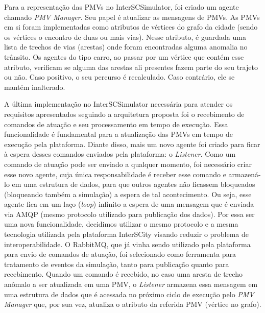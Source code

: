     

Para a representação das PMVs no InterSCSimulator, foi criado um agente chamado \textit{PMV Manager}.
Seu papel é atualizar as mensagens de PMVs.
As PMVs em si foram implementadas como atributos de vértices do grafo da cidade (sendo os vértices o encontro de duas ou mais vias).
Nesse atributo, é guardada uma lista de trechos de vias (arestas) onde foram encontradas alguma anomalia no trânsito.
Os agentes do tipo carro, ao passar por um vértice que contém esse atributo, verificam se alguma das arestas ali presentes fazem parte do seu trajeto ou não.
Caso positivo, o seu percurso é recalculado.
Caso contrário, ele se mantém inalterado.

A última implementação no InterSCSimulator necessária para atender os requisitos apresentados seguindo a arquitetura proposta foi o recebimento de comandos de atuação e
seu processamento em tempo de execução.
Essa funcionalidade é fundamental para a atualização das PMVs em tempo de execução pela plataforma.
Diante disso, mais um novo agente foi criado para ficar à espera desses comandos enviados pela plataforma: o \textit{Listener}.
Como um comando de atuação pode ser enviado a qualquer momento, foi necessário criar esse novo agente, cuja única responsabilidade é receber esse comando e armazená-lo em uma
estrutura de dados, para que outros agentes não ficassem bloqueados (bloqueando também a simulação) a espera de tal acontecimento.
Ou seja, esse agente fica em um laço (\textit{loop}) infinito a espera de uma mensagem que é enviada via AMQP (mesmo protocolo utilizado para publicação dos dados).
Por essa ser uma nova funcionalidade, decidimos utilizar o mesmo protocolo e a mesma tecnologia utilizada pela plataforma InterSCity visando reduzir o problema de interoperabilidade.
O RabbitMQ, que já vinha sendo utilizado pela plataforma para envio de comandos de atuação, foi selecionado como ferramenta para tratamento de eventos da simulação, tanto para publicação quanto para 
recebimento.
Quando um comando é recebido, no caso uma aresta de trecho anômalo a ser atualizada em uma PMV, o \textit{Listener} armazena essa mensagem em uma estrutura de dados que é acessada no
próximo ciclo de execução pelo \textit{PMV Manager} que, por sua vez, atualiza o atributo da referida PMV (vértice no grafo).

